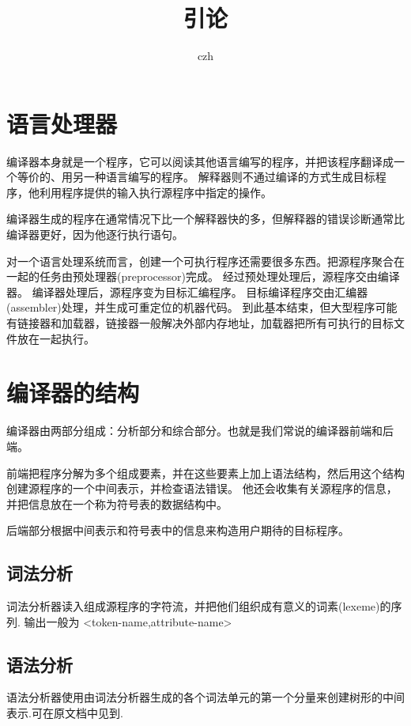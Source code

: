 \documentclass[UTF8]{ctexart}
\title{引论}
\author{czh}
\begin{document}
    \maketitle
    \tableofcontents
    \section{语言处理器}
    编译器本身就是一个程序，它可以阅读其他语言编写的程序，并把该程序翻译成一个等价的、用另一种语言编写的程序。
    解释器则不通过编译的方式生成目标程序，他利用程序提供的输入执行源程序中指定的操作。

    编译器生成的程序在通常情况下比一个解释器快的多，但解释器的错误诊断通常比编译器更好，因为他逐行执行语句。

    对一个语言处理系统而言，创建一个可执行程序还需要很多东西。把源程序聚合在一起的任务由预处理器(preprocessor)完成。
    经过预处理处理后，源程序交由编译器。
    编译器处理后，源程序变为目标汇编程序。
    目标编译程序交由汇编器(assembler)处理，并生成可重定位的机器代码。
    到此基本结束，但大型程序可能有链接器和加载器，链接器一般解决外部内存地址，加载器把所有可执行的目标文件放在一起执行。

    \section{编译器的结构}

    编译器由两部分组成：分析部分和综合部分。也就是我们常说的编译器前端和后端。
    
    前端把程序分解为多个组成要素，并在这些要素上加上语法结构，然后用这个结构创建源程序的一个中间表示，并检查语法错误。
    他还会收集有关源程序的信息，并把信息放在一个称为符号表的数据结构中。

    后端部分根据中间表示和符号表中的信息来构造用户期待的目标程序。

    \subsection{词法分析}

    词法分析器读入组成源程序的字符流，并把他们组织成有意义的词素(lexeme)的序列.
    输出一般为
        <token-name,attribute-name>

    \subsection{语法分析}

    语法分析器使用由词法分析器生成的各个词法单元的第一个分量来创建树形的中间表示.可在原文档中见到.
\end{document}
